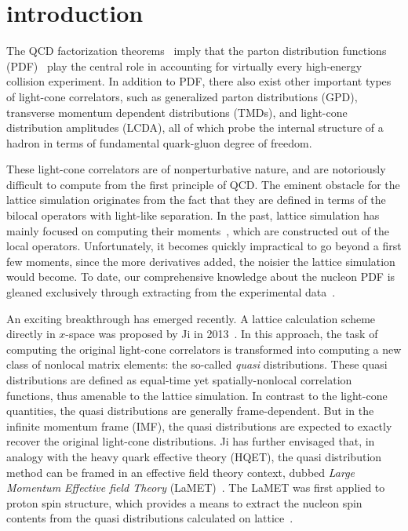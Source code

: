 \documentclass[english,preprint,aps,prd,showpacs,superscriptaddress,nofootinbib,tightenlines]{revtex4}
\begin{document}
\maketitle

\section{introduction}

The QCD factorization theorems~\cite{Collins:1989gx} imply that the
parton distribution functions (PDF)~\cite{Collins:1981uw} play the central role in accounting for virtually every
high-energy collision experiment.
In addition to PDF, there also exist other important types of light-cone correlators,
such as generalized parton distributions (GPD), transverse momentum dependent distributions
(TMDs), and light-cone distribution amplitudes (LCDA), all of which probe the internal structure of a hadron
in terms of fundamental quark-gluon degree of freedom.

These light-cone correlators are of nonperturbative nature, and are notoriously difficult to compute from
the first principle of QCD. The eminent obstacle for the lattice simulation originates from the fact that
they are defined in terms of the bilocal operators with light-like separation.
In the past,
lattice simulation has mainly focused on computing their
moments~\cite{Alexandrou:2015qia,Hagler:2007xi,Musch:2011er,Braun:2015lfa},
which are constructed out of the local operators.
Unfortunately, it becomes quickly impractical to go beyond a first few moments, since the more derivatives added,
the noisier the lattice simulation would become. To date,
our comprehensive knowledge about the nucleon PDF is gleaned exclusively through extracting from the
experimental data~\cite{Gao:2013xoa,Martin:2009iq,Ball:2014uwa}.

An exciting breakthrough has emerged recently.
A lattice calculation scheme directly in $x$-space was proposed by Ji in 2013~\cite{Ji:2013dva}.
In this approach, the task of computing the original light-cone correlators is transformed into computing
a new class of nonlocal matrix elements: the so-called {\it quasi} distributions.
These quasi distributions are defined as equal-time yet spatially-nonlocal correlation functions, thus amenable to
the lattice simulation.
In contrast to the light-cone quantities, the quasi distributions are generally frame-dependent.
But in the infinite momentum frame (IMF), the quasi distributions are expected to exactly recover the original
light-cone distributions. Ji has further envisaged that,
in analogy with the heavy quark effective theory (HQET), the quasi distribution method can be framed in an effective field theory context,
dubbed {\it Large Momentum Effective field Theory} (LaMET)~\cite{Ji:2014gla}.
The LaMET was first applied to proton spin structure,
which provides a means to extract the nucleon spin contents from the quasi distributions calculated on lattice~\cite{Ji:2013fga,Ji:2014lra}.
\end{document}
